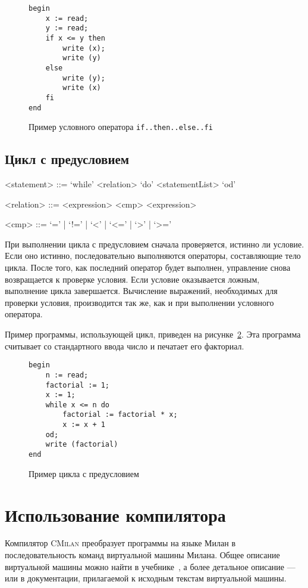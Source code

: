 \documentclass[a4paper,12pt]{article}
\begin{document}
\begin{figure}
\begin{lstlisting}
begin
    x := read;
    y := read;
    if x <= y then
        write (x);
        write (y)
    else
        write (y);
        write (x)
    fi
end
\end{lstlisting}
\label{ifthenelse}
\caption{Пример условного оператора \texttt{if..then..else..fi}}
\end{figure}

\subsection{Цикл с предусловием}

\begin{grammar}
<statement> ::= `while' <relation> `do' <statementList> `od'

<relation> ::= <expression> <cmp> <expression>

<cmp> ::= `=' | `!=' | `<' | `<=' | `>' | `>='
\end{grammar}

При выполнении цикла с предусловием сначала проверяется, истинно ли условие.
Если оно истинно, последовательно выполняются операторы, составляющие тело
цикла. После того, как последний оператор будет выполнен, управление снова
возвращается к проверке условия. Если условие оказывается ложным, выполнение
цикла завершается. Вычисление выражений, необходимых для проверки условия,
производится так же, как и при выполнении условного оператора.

Пример программы, использующей цикл, приведен на рисунке~\ref{while}. Эта
программа считывает со стандартного ввода число и печатает его факториал.

\begin{figure}
\begin{lstlisting}
begin
    n := read;
    factorial := 1;
    x := 1;
    while x <= n do
        factorial := factorial * x;
        x := x + 1
    od;
    write (factorial)
end
\end{lstlisting}
\label{while}
\caption{Пример цикла с предусловием}
\end{figure}

\section{Использование компилятора}

Компилятор \textsc{CMilan} преобразует программы на языке Милан в
последовательность команд виртуальной машины Милана. Общее описание виртуальной
машины можно найти в учебнике~\cite{karpov05}, а более детальное
описание ---  или в документации, прилагаемой к исходным текстам виртуальной
машины.
\end{document}
